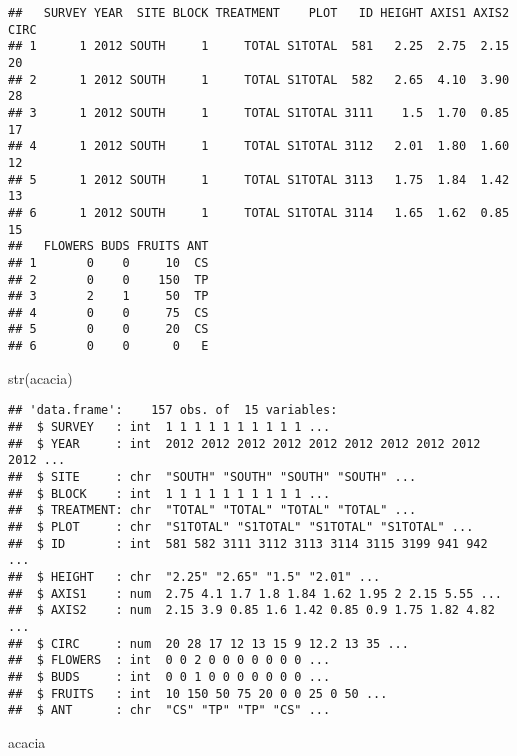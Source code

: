 \documentclass[
]{article}
\newenvironment{Shaded}{\begin{snugshade}}{\end{snugshade}}
\newcommand{\FunctionTok}[1]{\textcolor[rgb]{0.00,0.00,0.00}{#1}}
\newcommand{\NormalTok}[1]{#1}
\begin{document}
\begin{verbatim}
##   SURVEY YEAR  SITE BLOCK TREATMENT    PLOT   ID HEIGHT AXIS1 AXIS2 CIRC
## 1      1 2012 SOUTH     1     TOTAL S1TOTAL  581   2.25  2.75  2.15   20
## 2      1 2012 SOUTH     1     TOTAL S1TOTAL  582   2.65  4.10  3.90   28
## 3      1 2012 SOUTH     1     TOTAL S1TOTAL 3111    1.5  1.70  0.85   17
## 4      1 2012 SOUTH     1     TOTAL S1TOTAL 3112   2.01  1.80  1.60   12
## 5      1 2012 SOUTH     1     TOTAL S1TOTAL 3113   1.75  1.84  1.42   13
## 6      1 2012 SOUTH     1     TOTAL S1TOTAL 3114   1.65  1.62  0.85   15
##   FLOWERS BUDS FRUITS ANT
## 1       0    0     10  CS
## 2       0    0    150  TP
## 3       2    1     50  TP
## 4       0    0     75  CS
## 5       0    0     20  CS
## 6       0    0      0   E
\end{verbatim}

\begin{Shaded}
\begin{Highlighting}[]
\FunctionTok{str}\NormalTok{(acacia)}
\end{Highlighting}
\end{Shaded}

\begin{verbatim}
## 'data.frame':    157 obs. of  15 variables:
##  $ SURVEY   : int  1 1 1 1 1 1 1 1 1 1 ...
##  $ YEAR     : int  2012 2012 2012 2012 2012 2012 2012 2012 2012 2012 ...
##  $ SITE     : chr  "SOUTH" "SOUTH" "SOUTH" "SOUTH" ...
##  $ BLOCK    : int  1 1 1 1 1 1 1 1 1 1 ...
##  $ TREATMENT: chr  "TOTAL" "TOTAL" "TOTAL" "TOTAL" ...
##  $ PLOT     : chr  "S1TOTAL" "S1TOTAL" "S1TOTAL" "S1TOTAL" ...
##  $ ID       : int  581 582 3111 3112 3113 3114 3115 3199 941 942 ...
##  $ HEIGHT   : chr  "2.25" "2.65" "1.5" "2.01" ...
##  $ AXIS1    : num  2.75 4.1 1.7 1.8 1.84 1.62 1.95 2 2.15 5.55 ...
##  $ AXIS2    : num  2.15 3.9 0.85 1.6 1.42 0.85 0.9 1.75 1.82 4.82 ...
##  $ CIRC     : num  20 28 17 12 13 15 9 12.2 13 35 ...
##  $ FLOWERS  : int  0 0 2 0 0 0 0 0 0 0 ...
##  $ BUDS     : int  0 0 1 0 0 0 0 0 0 0 ...
##  $ FRUITS   : int  10 150 50 75 20 0 0 25 0 50 ...
##  $ ANT      : chr  "CS" "TP" "TP" "CS" ...
\end{verbatim}

\begin{Shaded}
\begin{Highlighting}[]
\NormalTok{acacia}
\end{Highlighting}
\end{Shaded}
\end{document}
